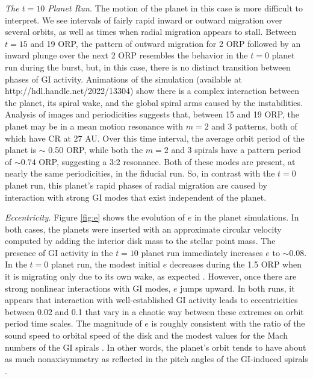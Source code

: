 \documentclass[12pt,manuscript,authoryear]{aastex}
\begin{document}
{\it The $t = 10$ Planet Run.} The motion of the planet in this case is more difficult to interpret. We see intervals of fairly rapid inward or outward migration over several orbits, as well as times when radial migration appears to stall. Between $t = 15$ and 19 ORP, the pattern of outward migration for 2 ORP followed by an inward plunge over the next 2 ORP resembles the behavior in the $t = 0$ planet run during the burst, but, in this case, there is no distinct transition between phases of GI activity. Animations of the simulation (available at http://hdl.handle.net/2022/13304) show there is a complex interaction between the planet, its spiral wake, and the global spiral arms caused by the instabilities. Analysis of images and periodicities suggests that, between 15 and 19 ORP, the planet may be in a mean motion resonance with $m = 2$ and 3 patterns, both of which have CR at 27 AU. Over this time interval, the average orbit period of the planet is $\sim$ 0.50 ORP, while both the $m = 2$ and 3 spirals have a pattern period of $\sim 0.74$ ORP, suggesting a 3:2 resonance. Both of these modes are present, at nearly the same periodicities, in the fiducial run. So, in contrast with the $t = 0$ planet run, this planet's rapid phases of radial migration are caused by interaction with strong GI modes that exist independent of the planet.

{\it Eccentricity.} Figure \ref{fig:e} shows the evolution of $e$ in the planet simulations. In both cases, the planets were inserted with an approximate circular velocity computed by adding the interior disk mass to the stellar point mass. The presence of GI activity in the $t = 10$ planet run immediately increases $e$ to $\sim 0.08$. In the $t = 0$ planet run, the modest initial $e$ decreases during the 1.5 ORP when it is migrating only due to its own wake, as expected \citep{ward1998,ward2003,goldreich2004}. 
However, once there are strong nonlinear interactions with GI modes, $e$ jumps upward. In both runs, it appears that interaction with well-established GI activity leads to eccentricities between 0.02 and 0.1 that vary in a chaotic way between these extremes on orbit period time scales. The magnitude of $e$ is roughly consistent with the ratio of the sound speed to orbital speed of the disk and the modest values for the Mach numbers of the GI spirals \citep{boley2006a,boley2008}. In other words, the planet's orbit tends to have about as much nonaxisymmetry as reflected in the pitch angles of the GI-induced spirals \citep{cossins2009}.
\end{document}
